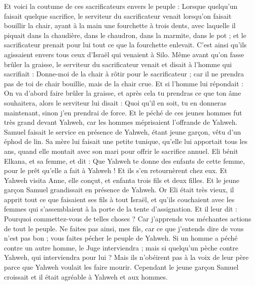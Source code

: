 \begin{multicols}{2}
Et voici la coutume de ces sacrificateurs envers le peuple : Lorsque quelqu'un faisait quelque sacrifice, le serviteur du sacrificateur venait lorsqu'on faisait bouillir la chair, ayant à la main une fourchette à trois dents,
avec laquelle il piquait dans la chaudière, dans le chaudron, dans la marmite, dans le pot ; et le sacrificateur prenait pour lui tout ce que la fourchette enlevait. C'est ainsi qu'ils agissaient envers tous ceux d'Israël qui venaient à Silo.
Même avant qu'on fasse brûler la graisse, le serviteur du sacrificateur venait et disait à l'homme qui sacrifiait : Donne-moi de la chair à rôtir pour le sacrificateur ; car il ne prendra pas de toi de chair bouillie, mais de la chair crue.
Et si l'homme lui répondait : On va d'abord faire brûler la graisse, et après cela tu prendras ce que ton âme souhaitera, alors le serviteur lui disait : Quoi qu'il en soit, tu en donneras maintenant, sinon j'en prendrai de force.
Et le péché de ces jeunes hommes fut très grand devant Yahweh, car les hommes méprisaient l'offrande de Yahweh.
Samuel faisait le service en présence de Yahweh, étant jeune garçon, vêtu d'un éphod de lin.
Sa mère lui faisait une petite tunique, qu'elle lui apportait tous les ans, quand elle montait avec son mari pour offrir le sacrifice annuel.
Eli bénit Elkana, et sa femme, et dit : Que Yahweh te donne des enfants de cette femme, pour le prêt qu'elle a fait à Yahweh ! Et ils s'en retournèrent chez eux.
Et Yahweh visita Anne, elle conçut, et enfanta trois fils et deux filles. Et le jeune garçon Samuel grandissait en présence de Yahweh.
Or Eli était très vieux, il apprit tout ce que faisaient ses fils à tout Israël, et qu'ils couchaient avec les femmes qui s’assemblaient à la porte de la tente d'assignation.
Et il leur dit : Pourquoi commettez-vous de telles choses ? Car j'apprends vos méchantes actions de tout le peuple.
Ne faites pas ainsi, mes fils, car ce que j'entends dire de vous n'est pas bon ; vous faites pécher le peuple de Yahweh.
Si un homme a péché contre un autre homme, le Juge interviendra ; mais si quelqu'un pèche contre Yahweh, qui interviendra pour lui ? Mais ils n'obéirent pas à la voix de leur père parce que Yahweh voulait les faire mourir.
Cependant le jeune garçon Samuel croissait et il était agréable à Yahweh et aux hommes.

\end{multicols}
